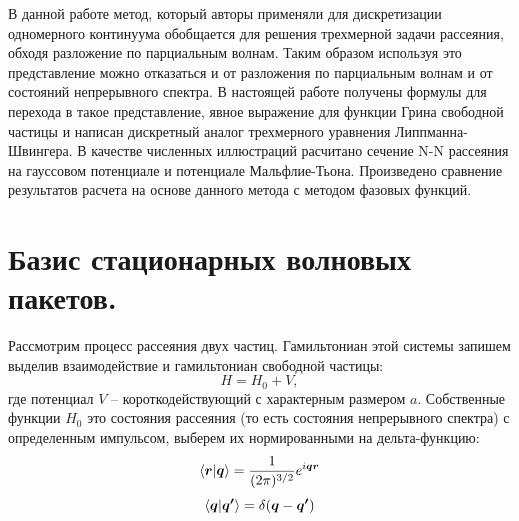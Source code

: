 \documentclass[a4paper,12pt]{article}
\newcommand{\vect}[1]{\boldsymbol{#1}}
\begin{document}
В данной работе метод, который авторы \cite{kuku2}\cite{kuku1} применяли для дискретизации одномерного континуума обобщается для решения трехмерной задачи рассеяния, обходя разложение по парциальным волнам. %
Таким образом используя это представление можно отказаться и от разложения по парциальным волнам и от состояний непрерывного спектра. В настоящей работе получены формулы для перехода в такое представление, явное выражение для функции Грина свободной частицы и написан дискретный аналог трехмерного уравнения Липпманна-Швингера. В качестве численных иллюстраций расчитано сечение N-N рассеяния на гауссовом потенциале и потенциале Мальфлие-Тьона. Произведено сравнение результатов расчета на основе данного метода с методом фазовых функций\cite{babik}.


\newline
	\section{Базис стационарных волновых пакетов.}
Рассмотрим процесс рассеяния двух частиц. Гамильтониан этой системы запишем выделив взаимодействие и гамильтониан свободной частицы:
\[
	H = H_0 + V,
\]
где потенциал $V$ – короткодействующий с характерным размером $a$. Собственные функции $H_0$ это состояния рассеяния (то есть состояния непрерывного спектра) с определенным импульсом, выберем их нормированными на дельта-функцию:
\[
	\braket{\vect{r}|\vect{q}} = \frac{1}{(2\pi)^{3/2}}e^{i\vect{q}\vect{r}} 
\]\[
	\braket{\vect{q}|\vect{q'}} = \delta(\vect{q} - \vect{q'})
\]
\end{document}
